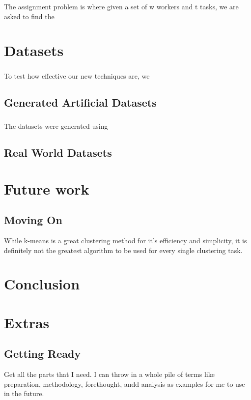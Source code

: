\documentclass[12pt]{dalthesis}
\begin{document}
\paragraph{}
The assignment problem is where given a set of w workers and t tasks, we are asked to find the

\chapter{Datasets}
\paragraph{}
To test how effective our new techniques are, we 
\section{Generated Artificial Datasets}
\paragraph{}
The datasets were generated using 
\section{Real World Datasets}
\chapter{Future work}
\section{Moving On}
While k-means is a great clustering method for it's efficiency and simplicity, it is definitely not the greatest algorithm to be used for every single clustering task. 

\chapter{Conclusion}


\chapter{Extras}

\section{Getting Ready}

Get all the parts that I need.  I can throw in a whole pile of terms like
preparation,
methodology,
forethought,
andd
analysis
as examples for me to use in the future.
\end{document}
